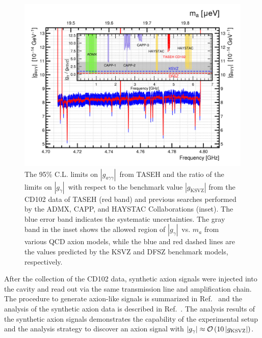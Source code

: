 \documentclass[%
 reprint,prl, %
superscriptaddress,
nobibnotes,
 amsmath,amssymb,
 aps,
]{revtex4-2}
\newcommand{\gagg}{\ensuremath{\left|g_{a\gamma\gamma}\right|}}
\newcommand{\ggamma}{\ensuremath{\left|g_{\gamma}\right|}}
\begin{document}
\begin{figure} [htbp]
  \centering
  \includegraphics[width=12.9cm]{figures/combineTASEH_all.png}
  \caption{The 95\% C.L. limits on \gagg\ from TASEH and the ratio of the 
limits on \ggamma\ with respect to 
the benchmark value $\left|g_\text{KSVZ}\right|$ 
 from the CD102 data of TASEH (red band) and previous searches performed by the ADMX, CAPP, and HAYSTAC Collaborations (inset). 
 The blue error band indicates the systematic 
  uncertainties. The gray band in the inset shows the allowed region of 
 \ggamma\ vs. $m_a$ 
 from various QCD axion models, while the blue and red dashed lines are the 
values predicted by the KSVZ and DFSZ benchmark models, respectively.
 }

  \label{fig:gaggall}
\end{figure}




After the collection of the CD102 data, 
synthetic axion signals were injected into the cavity and read out via the 
same transmission line and amplification chain. 
The procedure to generate axion-like signals is summarized in 
Ref.~\cite{TASEHInstrumentation} and the analysis of the synthetic axion 
data is described in Ref.~\cite{TASEHAnalysis}. 
The analysis results of the synthetic axion signals demonstrates
the capability of the experimental setup and the analysis strategy to discover
an axion signal with 
$\ggamma\approx {\cal O}\left(10\left|g_\text{KSVZ}\right|\right)$.
\end{document}
